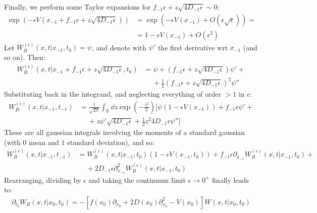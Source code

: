 \documentclass[../template.tex]{subfiles}
\begin{document}
\begin{exo}
    Finally, we perform some Taylor expansions for $f_{-1}\epsilon + z\sqrt{4 D_{-1}\epsilon} \sim 0$:
    \begin{align*}
        \exp\left(-\epsilon V(x_{-1}+f_{-1}\epsilon + z\sqrt{4 D_{-1}\epsilon})\right) &= \exp\left(-\epsilon V(x_{-1}) + O(\epsilon\sqrt{\epsilon})\right) =\\
        &=1-\epsilon V(x_{-1}) + O(\epsilon^2)
    \end{align*} 
    Let $W_B^{(\epsilon)}(x,t|x_{-1},t_0) = \psi$, and denote with $\psi'$ the first derivative wrt $x_{-1}$ (and so on). Then:
    \begin{align*}
        W_B^{(\epsilon)}(x,t|x_{-1}+f_{-1}\epsilon + z \sqrt{4 D_{-1}\epsilon},t_0) &= \psi + (f_{-1} \epsilon + z\sqrt{4 D_{-1}\epsilon}) \psi' +\\
        &\quad \> + \frac{1}{2}(f_{-1} \epsilon + z \sqrt{4 D_{-1}\epsilon})^2 \psi'' 
    \end{align*}
    Substituting back in the integrand, and neglecting everything of order $>1$ in $\epsilon$:
    \begin{align*}
        W_B^{(\epsilon)}(x,t|x_{-1},t_{-1}) &= \frac{1}{\sqrt{2 \pi}} \int_{\mathbb{R}} \dd{z} \exp\left(-\frac{z^2}{2} \right)\Bigg[\psi(1-\epsilon V(x_{-1})) + f_{-1}\epsilon \psi' +\\
        &\quad \>+  z \psi' \sqrt{4 D_{-1} \epsilon} + \frac{1}{2} z^2 4 D_{-1} \epsilon \psi'' \Bigg]
    \end{align*}
    These are all gaussian integrals involving the moments of a standard gaussian (with $0$ mean and $1$ standard deviation), and so:
    \begin{align*}
        W_B^{(\epsilon)}(x,t|x_{-1},t_{-1}) &= W_B^{(\epsilon)}(x,t|x_{-1},t_0) (1 - \epsilon V(x_{-1},t_0)) + f_{-1} \epsilon \partial_{x_{-1}} W_B^{(\epsilon)}(x,t|x_{-1},t_0)+\\
        &\quad \> + 2D_{-1} \epsilon \partial_{x_{-1}}^2 W_B^{(\epsilon)}(x,t|x_{-1},t_0)
    \end{align*}
    Rearranging, dividing by $\epsilon$ and taking the continuum limit $\epsilon \to 0^+$ finally leads to:
    \begin{align*}
        \partial_{t_0} W_B(x,t|x_0,t_0) = -[f(x_0) \partial_{x_0} + 2D(x_0)\partial_{x_0}^2 - V(x_0)]W(x,t|x_0,t_0)
    \end{align*}
\end{exo}

\setcounter{exo}{4} %
\end{document}
